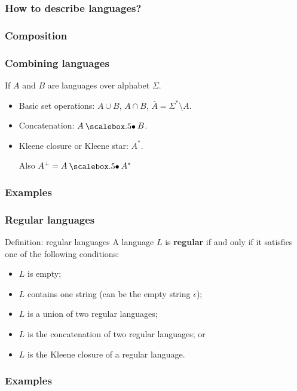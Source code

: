 \begin{frame}
  \frametitle{How to describe languages?}
\end{frame}

\begin{frame}
  \frametitle{Composition}
\end{frame}

\begin{frame}
  \frametitle{Combining languages}

  If $A$ and $B$ are languages over alphabet $\Sigma$.
  
  \begin{itemize}
  \item Basic set operations: $A\cup B$, $A\cap B$, $\bar{A}=\Sigma^*\setminus A$.
  \item Concatenation: $A\sbullet B$.
    \vspace{1in}
  \item Kleene closure or Kleene star: $A^*$.

    \vspace{1in}
    
    Also $A^+=A\sbullet A^*$
  \end{itemize}
\end{frame}

\begin{frame}
  \frametitle{Examples}
\end{frame}

\begin{frame}
  \frametitle{Regular languages}
  \begin{block}{Definition: regular languages}
    A language $L$ is {\color{red}\bf regular} if and only if it
    satisfies one of the following conditions:
    \begin{itemize}
    \item $L$ is empty;
    \item $L$ contains one string (can be the empty string $\epsilon$);
    \item $L$ is a union of two regular languages;
    \item $L$ is the concatenation of two regular languages; or
    \item $L$ is the Kleene closure of a regular language.
    \end{itemize}
  \end{block}
\end{frame}

\begin{frame}
  \frametitle{Examples}
\end{frame}

